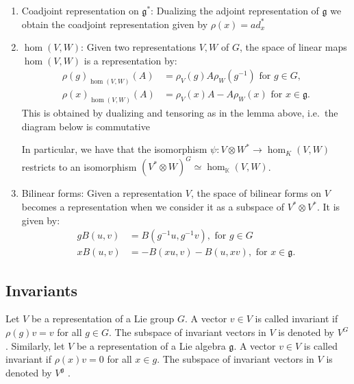 \documentclass{report}
\begin{document}
\begin{example}
    \begin{enumerate}[label = (\roman*)]
        \item Coadjoint representation on $\mathfrak g^*$: Dualizing the adjoint representation of $\mathfrak g$ we obtain the coadjoint representation given by $\rho(x) = ad_x^*$
        \item $\hom(V,W)$: Given two representations $V, W$ of $G$, the space of linear maps $\hom(V,W)$ is a representation by:
        \begin{align*}
            \rho(g)_{\hom(V,W)}(A) &= \rho_V(g)A\rho_W(g^{-1}) \text{ for } g \in G,\\
            \rho(x)_{\hom(V,W)}(A) &= \rho_V(x)A - A\rho_W(x) \text{ for } x \in \mathfrak g.
        \end{align*}
        This is obtained by dualizing and tensoring as in the lemma above, i.e.\ the diagram below is commutative\\
        \begin{center}
        \end{center}
        In particular, we have that the isomorphism $\psi: V \otimes W^* \to \hom_K(V,W)$ restricts to an isomorphism $ (V^* \otimes W)^G \simeq \hom_{\mathbb K}(V, W)$.
        \item Bilinear forms: Given a representation $V$, the space of bilinear forms on $V$ becomes a representation when we consider it as a subspace of $V^* \otimes V^*$. It is given by:
        \begin{align*}
            g B(u, v) &= B(g^{-1}u, g^{-1}v), \text{ for } g \in G\\
            x B(u, v) &= -B(x u, v) - B(u, x v), \text{ for } x \in \mathfrak g.    
        \end{align*}
    \end{enumerate}
\end{example}

\subsection{Invariants}
\begin{definition}
    Let $V$ be a representation of a Lie group $G$. A vector $v \in V$ is
    called invariant if $\rho(g)v = v$ for all $g \in G$. The subspace of invariant vectors
    in $V$ is denoted by $V^G$.
    Similarly, let $V$ be a representation of a Lie algebra $\mathfrak g$. A vector $v \in V$ is
    called invariant if $\rho(x)v = 0$ for all $x \in g$. The subspace of invariant vectors
    in $V$ is denoted by $V^{\mathfrak g}$ .
\end{definition}
\end{document}
